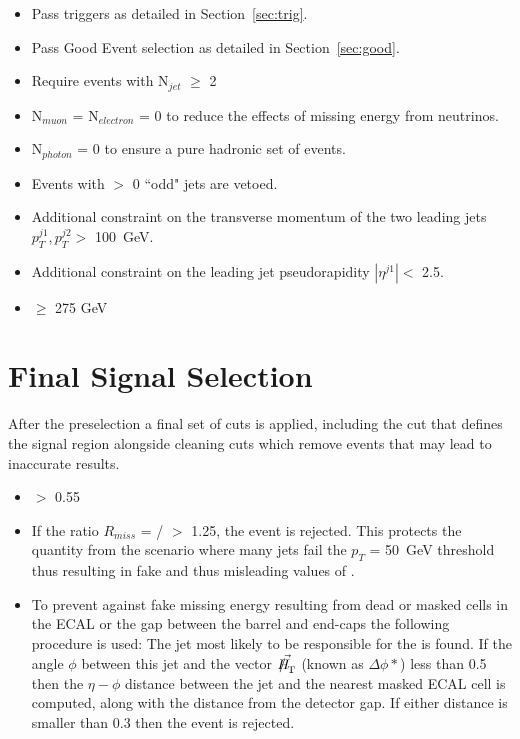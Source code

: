 \begin{itemize}
\item Pass triggers as detailed in Section~\ref{sec:trig}.
\item Pass Good Event selection as detailed in Section~\ref{sec:good}.
\item{Require events with N$_{jet}$ $\geq$ 2}
\item N$_{muon}$ = N$_{electron}$ = 0 to reduce the effects of missing energy from neutrinos.
\item N$_{photon}$ = 0 to ensure a pure hadronic set of events.
\item Events with $>$ 0 ``odd" jets are vetoed.
\item Additional constraint on the transverse momentum of the two leading jets $p^{j1}_{T},p^{j2}_{T} >$ 100~GeV.
\item Additional constraint on the leading jet pseudorapidity $|\eta^{j1}| <$ 2.5.
\item \HT $\geq$ 275 GeV
\end{itemize}



\section{Final Signal Selection}

After the preselection a final set of cuts is applied, including the \alt cut that defines the signal region alongside cleaning cuts which remove events that may lead to inaccurate results.

\begin{itemize}
\item \alt $>$ 0.55
\item{If the ratio $R_{miss}$ = \mht / \met $>$ 1.25, the event is rejected. This protects the quantity \alt from the scenario where many jets fail the $p_{T}$ = 50~GeV threshold thus resulting in fake \mht and thus misleading values of \alt. }
\item{To prevent against fake missing energy resulting from dead or masked cells in the ECAL or the gap between the barrel and end-caps the following procedure is used: The jet most likely to be responsible for the \MHT is found. If the angle $\phi$ between this jet and the vector $\vec{\MHT}$ (known as $\Delta \phi*$) less than 0.5 then the $\eta-\phi$ distance between the jet and the nearest masked ECAL cell is computed, along with the distance from the detector gap. If either distance is smaller than 0.3 then the event is rejected. }

\end{itemize}




